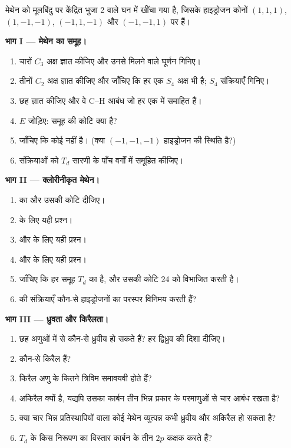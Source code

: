 \begin{problem}
\label{pb:b3:point-groups:1}
मेथेन को मूलबिंदु पर केंद्रित भुजा 2 वाले घन में खींचा गया है, जिसके हाइड्रोजन
कोनों $(1,1,1)$, $(1,-1,-1)$, $(-1,1,-1)$ और $(-1,-1,1)$ पर हैं।

\medskip\noindent\textbf{भाग I --- मेथेन का समूह।}
\begin{enumerate}
  \item चारों $C_3$ अक्ष ज्ञात कीजिए और उनसे मिलने वाले घूर्णन गिनिए।
  \item तीनों $C_2$ अक्ष ज्ञात कीजिए और जाँचिए कि हर एक $S_4$ अक्ष भी है;
        $S_4$ संक्रियाएँ गिनिए।
  \item छह  ज्ञात कीजिए और वे C--H आबंध जो हर एक में समाहित हैं।
  \item $E$ जोड़िए: समूह की कोटि क्या है?
  \item जाँचिए कि कोई  नहीं है। (क्या $(-1,-1,-1)$ हाइड्रोजन की
        स्थिति है?)
  \item संक्रियाओं को $T_d$ सारणी के पाँच वर्गों में समूहित कीजिए।
\end{enumerate}

\medskip\noindent\textbf{भाग II --- क्लोरीनीकृत मेथेन।}
\begin{enumerate}[resume]
  \item {} का  और उसकी कोटि दीजिए।
  \item {} के लिए यही प्रश्न।
  \item {} और  के लिए यही प्रश्न।
  \item {} और  के लिए यही प्रश्न।
  \item जाँचिए कि हर समूह $T_d$ का  है, और उसकी कोटि 24 को विभाजित करती है।
  \item {} की संक्रियाएँ कौन-से हाइड्रोजनों का परस्पर विनिमय करती हैं?
\end{enumerate}

\medskip\noindent\textbf{भाग III --- ध्रुवता और किरैलता।}
\begin{enumerate}[resume]
  \item छह अणुओं में से कौन-से ध्रुवीय हो सकते हैं? हर
        द्विध्रुव की दिशा दीजिए।
  \item कौन-से किरैल हैं?
  \item किरैल अणु के कितने त्रिविम समावयवी होते हैं?
  \item {} अकिरैल क्यों है, यद्यपि उसका कार्बन तीन भिन्न प्रकार के परमाणुओं
        से चार आबंध रखता है?
  \item क्या चार भिन्न प्रतिस्थापियों वाला कोई मेथेन व्युत्पन्न कभी
        ध्रुवीय और अकिरैल हो सकता है?
  \item $T_d$ के किस निरूपण का विस्तार कार्बन के तीन $2p$ कक्षक
        करते हैं?
\end{enumerate}


\end{problem}
